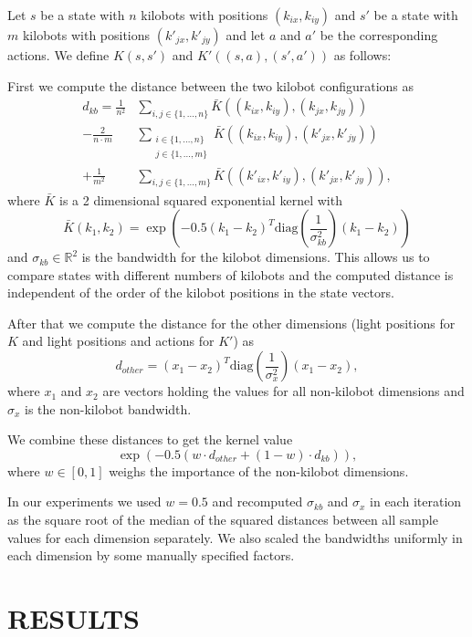 \documentclass[twoside]{article}
\begin{document}
Let $s$ be a state with $n$ kilobots with positions $(k_{ix}, k_{iy})$
and $s'$ be a state with $m$ kilobots with positions $(k'_{jx}, k'_{jy})$ and
let $a$ and $a'$ be the corresponding actions.
We define $K(s, s')$ and $K'((s, a), (s', a'))$ as follows:

First we compute the distance between the two kilobot configurations as
\begin{align*}
d_{kb} =
  \frac{1}{n^2} &\sum_{i,j \in \{1,\dots,n\}}
    \bar{K}((k_{ix}, k_{iy}), (k_{jx}, k_{jy})) \\
- \frac{2}{n \cdot m} &\sum_{\substack{i \in \{1,\dots,n\}\\j \in \{1,\dots,m\}}}
    \bar{K}((k_{ix}, k_{iy}), (k'_{jx}, k'_{jy})) \\
+ \frac{1}{m^2} &\sum_{i,j \in \{1,\dots,m\}}
    \bar{K}((k'_{ix}, k'_{iy}), (k'_{jx}, k'_{jy})),
\end{align*}
where $\bar{K}$ is a 2 dimensional squared exponential kernel with
$$
\bar{K}(k_1, k_2) =
    \exp \left(-0.5 (k_1 - k_2)^T
    \mathrm{diag}\left(\frac{1}{\sigma_{kb}^2}\right) (k_1 - k_2)\right)
$$
and $\sigma_{kb} \in \mathbb{R}^2$ is the bandwidth for the kilobot dimensions.
This allows us to compare states with different numbers of kilobots and the
computed distance is independent of the order of the kilobot positions in the
state vectors.

After that we compute the distance for the other dimensions (light positions for
$K$ and light positions and actions for $K'$) as
$$
d_{other} = (x_1 - x_2)^T \mathrm{diag}\left(\frac{1}{\sigma_{x}^2}\right) (x_1 - x_2),
$$
where $x_1$ and $x_2$ are vectors holding the values for all non-kilobot
dimensions and $\sigma_x$ is the non-kilobot bandwidth.

We combine these distances to get the kernel value
$$
\exp(-0.5 (w \cdot d_{other} + (1 - w) \cdot d_{kb})),
$$
where $w \in [0,1]$ weighs the importance of the non-kilobot dimensions.

In our experiments we used $w = 0.5$ and recomputed $\sigma_{kb}$ and $\sigma_x$
in each iteration as the square root of the median of the squared distances
between all sample values for each dimension separately. We also scaled the
bandwidths uniformly in each dimension by some manually specified factors.

\section{RESULTS}
\end{document}
